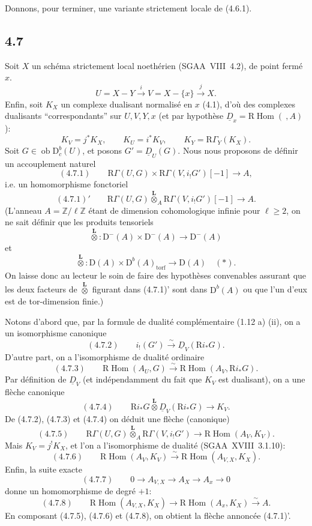 \documentclass[11pt]{article}
\DeclareMathOperator{\Hom}{Hom}
\newcommand{\R}{\mathrm{R}}\newcommand{\RHomCore}{\mathrm{RHom}}
\newcommand{\D}{\mathrm{D}}
\newcommand{\Z}{\mathbb{Z}}
\newcommand{\ob}{\operatorname{ob}}
\providecommand{\Hom}{\operatorname{Hom}}
\providecommand{\ob}{\operatorname{ob}}
\providecommand{\R}{\mathrm R}
\providecommand{\Z}{\mathbb Z}
\providecommand{\Hom}{\operatorname{Hom}}
\begin{document}
Donnons, pour terminer, une variante strictement locale de (4.6.1).

\subsection*{4.7}
Soit $X$ un schéma strictement local noethérien (SGAA~VIII~4.2), de point fermé $x$.%
\[
U=X-Y\xrightarrow{i}V=X-\{x\}\xrightarrow{j}X.
\]
Enfin, soit $K_X$ un complexe dualisant normalisé en $x$ (4.1), d'où des complexes dualisants ``correspondants'' sur $U,V,Y,x$ (et par hypothèse $\underline{D}_x=\R\Hom(\ ,A)$):
\[
K_V=j^*K_X,
\qquad K_U=i^*K_V,
\qquad K_Y=\R\Gamma_Y(K_X).
\]
Soit $G\in\ob\D_c^b(U)$, et posons $G'=\underline{D}_U(G)$. Nous nous proposons de définir un accouplement naturel
\[
(4.7.1)\qquad \R\Gamma(U,G)\times \R\Gamma(V,i_!G')[-1]\longrightarrow A,
\]
i.e. un homomorphisme fonctoriel
\[
(4.7.1)'\qquad \R\Gamma(U,G)\overset{\mathbf L}{\otimes}_A\R\Gamma(V,i_!G')[-1]\longrightarrow A.
\]
(L'anneau $A=\Z/\ell\Z$ étant de dimension cohomologique infinie pour $\ell\geqslant2$, on ne sait définir que les produits tensoriels
\[
\overset{\mathbf L}{\otimes}:\D^-(A)\times\D^-(A)\longrightarrow\D^-(A)
\]
et
\[
\overset{\mathbf L}{\otimes}:\D(A)\times\D^b(A)_{\mathrm{torf}}\longrightarrow\D(A)\quad(*).
\]
On laisse donc au lecteur le soin de faire des hypothèses convenables assurant que les deux facteurs de $\overset{\mathbf L}{\otimes}$ figurant dans (4.7.1)' sont dans $\D^b(A)$ ou que l'un d'eux est de tor-dimension finie.)

Notons d'abord que, par la formule de dualité complémentaire (1.12 a) (ii), on a un isomorphisme canonique
\[
(4.7.2)\qquad i_!(G')\xrightarrow{\sim}\underline{D}_V(\R i_*G).
\]
D'autre part, on a l'isomorphisme de dualité ordinaire
\[
(4.7.3)\qquad \R\Hom(A_U,G)\xrightarrow{\sim}\R\Hom(A_V,\R i_*G).
\]
Par définition de $\underline{D}_V$ (et indépendamment du fait que $K_V$ est dualisant), on a une flèche canonique
\[
(4.7.4)\qquad \R i_*G\overset{\mathbf L}{\otimes}\underline{D}_V(\R i_*G)\longrightarrow K_V.
\]
De (4.7.2), (4.7.3) et (4.7.4) on déduit une flèche (canonique)
\[
(4.7.5)\qquad \R\Gamma(U,G)\overset{\mathbf L}{\otimes}_A\R\Gamma(V,i_!G')\longrightarrow \R\Hom(A_V,K_V).
\]
Mais $K_V=j^{!}K_X$, et l'on a l'isomorphisme de dualité (SGAA~XVIII~3.1.10):
\[
(4.7.6)\qquad \R\Hom(A_V,K_V)\xrightarrow{\sim}\R\Hom(A_{V,X},K_X).
\]
Enfin, la suite exacte
\[
(4.7.7)\qquad 0\longrightarrow A_{V,X}\longrightarrow A_X\longrightarrow A_x\longrightarrow 0
\]
donne un homomorphisme de degré $+1$:
\[
(4.7.8)\qquad \R\Hom(A_{V,X},K_X)\longrightarrow \R\Hom(A_x,K_X)\xrightarrow{\sim}A.
\]
En composant (4.7.5), (4.7.6) et (4.7.8), on obtient la flèche annoncée (4.7.1)'.
\end{document}
